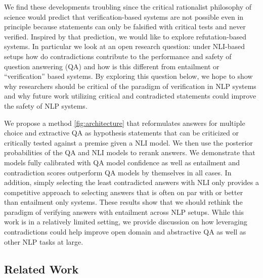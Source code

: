 \documentclass[11pt]{article}
\begin{document}
We find these developments troubling since the critical rationalist philosophy of science \citep{miller_critical_2015} would predict that verification-based systems are not possible even in principle because statements can only be falsified with critical tests and never verified. Inspired by that prediction, we would like to explore refutation-based systems. In particular we look at an open research question: under NLI-based setups how do contradictions contribute to the performance and safety of question answering (QA) and how is this different from entailment or “verification” based systems. By exploring this question below, we hope to show why researchers should be critical of the paradigm of verification in NLP systems and why future work utilizing critical and contradicted statements could improve the safety of NLP systems.

We propose a method \ref{fig:architecture} that reformulates answers for multiple choice and extractive QA as hypothesis statements that can be criticized or critically tested against a premise given a NLI model. We then use the posterior probabilities of the QA and NLI models to rerank answers. We demonstrate that models fully calibrated with QA model confidence as well as entailment and contradiction scores outperform QA models by themselves in all cases. In addition, simply selecting the least contradicted answers with NLI only provides a competitive approach to selecting answers that is often on par with or better than entailment only systems. These results show that we should rethink the paradigm of verifying answers with entailment across NLP setups. While this work is in a relatively limited setting, we provide discussion on how leveraging contradictions could help improve open domain and abstractive QA as well as other NLP tasks at large.


\subsection{Related Work}
\end{document}
